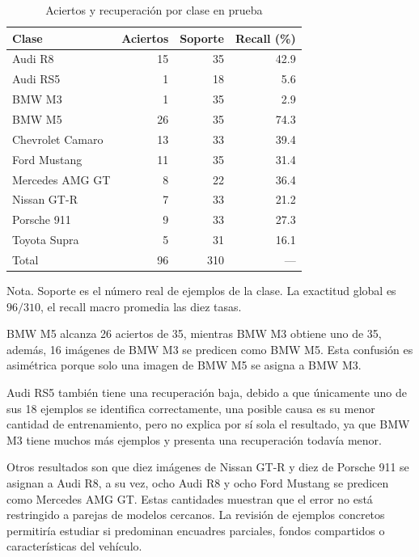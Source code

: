 \documentclass[conference]{IEEEtran}
\begin{document}
\begin{table}[!htbp]
\caption{Aciertos y recuperación por clase en prueba}
\label{tab:recallclases}
\centering
\small
\begin{tabular}{lrrr}
\toprule
Clase & Aciertos & Soporte & Recall (\%) \\
\midrule
Audi R8 & 15 & 35 & 42.9 \\
Audi RS5 & 1 & 18 & 5.6 \\
BMW M3 & 1 & 35 & 2.9 \\
BMW M5 & 26 & 35 & 74.3 \\
Chevrolet Camaro & 13 & 33 & 39.4 \\
Ford Mustang & 11 & 35 & 31.4 \\
Mercedes AMG GT & 8 & 22 & 36.4 \\
Nissan GT-R & 7 & 33 & 21.2 \\
Porsche 911 & 9 & 33 & 27.3 \\
Toyota Supra & 5 & 31 & 16.1 \\
\midrule
Total & 96 & 310 & --- \\
\bottomrule
\end{tabular}
\par\smallskip
\begin{minipage}{\columnwidth}\scriptsize
Nota. Soporte es el número real de ejemplos de la clase. La exactitud global es $96/310$, el recall macro promedia las diez tasas.
\end{minipage}
\end{table}

BMW M5 alcanza 26 aciertos de 35, mientras BMW M3 obtiene uno de 35, además, 16 imágenes de BMW M3 se predicen como BMW M5. Esta confusión es asimétrica porque solo una imagen de BMW M5 se asigna a BMW M3. 

Audi RS5 también tiene una recuperación baja, debido a que únicamente uno de sus 18 ejemplos se identifica correctamente, una posible causa es su menor cantidad de entrenamiento, pero no explica por sí sola el resultado, ya que BMW M3 tiene muchos más ejemplos y presenta una recuperación todavía menor.

Otros resultados son que diez imágenes de Nissan GT-R y diez de Porsche 911 se asignan a Audi R8, a su vez, ocho Audi R8 y ocho Ford Mustang se predicen como Mercedes AMG GT. Estas cantidades muestran que el error no está restringido a parejas de modelos cercanos. La revisión de ejemplos concretos permitiría estudiar si predominan encuadres parciales, fondos compartidos o características del vehículo.
\end{document}
